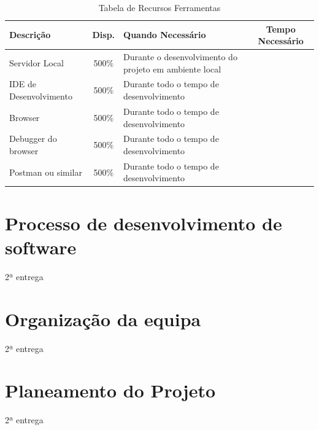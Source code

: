 \documentclass[a4paper]{report}
\begin{document}
\begin{table}[h]
\centering
\begin{tabularx}{\textwidth}{l|c|X|c}
\textbf{Descrição} & \textbf{Disp.} & \textbf{Quando Necessário} & \textbf{Tempo Necessário} \\ \hline
Servidor Local & 500\% & Durante o desenvolvimento do projeto em ambiente local &  \\ \hline
IDE de Desenvolvimento & 500\% & Durante todo o tempo de desenvolvimento &  \\ \hline
Browser & 500\% & Durante todo o tempo de desenvolvimento &  \\ \hline
Debugger do browser & 500\% & Durante todo o tempo de desenvolvimento &  \\ \hline
Postman ou similar & 500\% & Durante todo o tempo de desenvolvimento &  \\
\end{tabularx}
\caption{Tabela de Recursos Ferramentas}
\label{TabF}
\end{table}
\pagebreak
\section{Processo de desenvolvimento de software}
2ª entrega
\section{Organização da equipa}
2ª entrega
\section{Planeamento do Projeto}
2ª entrega
\end{document}
